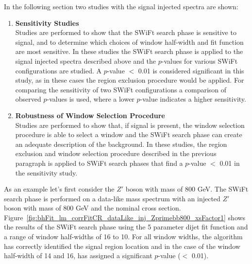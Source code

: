 \newpage
\noindent
In the following section two studies with the signal injected spectra are shown:
\begin{enumerate}
  \item\textbf{Sensitivity Studies}\\
  Studies are performed to show that the SWiFt search phase is sensitive to signal,
  and to determine which choices of window half-width and fit function are most sensitive.
  In these studies the SWiFt search phase is applied to the signal injected spectra described above and
  the \bh{} \mbox{$p$-value}s for various SWiFt configurations are studied.
  A \mbox{$p$-value} $<$ 0.01 is considered significant in this study,
  as in these cases the region exclusion procedure would be applied.
  For comparing the sensitivity of two SWiFt configurations a comparison of
  observed \bh{} \mbox{$p$-value}s is used, where a lower \mbox{$p$-value} indicates a higher sensitivity.\vspace{1em}
  
  \item\textbf{Robustness of Window Selection Procedure}\\
    Studies are performed to show that, if signal is present, the window selection procedure is able to select a window and
    the SWiFt search phase can create an adequate description of the background.
    In these studies, the region exclusion and window selection procedure described in the previous paragraph is applied
    to SWiFt search phases that find a \bh{} \mbox{$p$-value} $<$ 0.01 in the sensitivity study.
\end{enumerate}




As an example let's first consider the $Z'$ boson with mass of 800 GeV.
The  SWiFt search phase is performed on a data-like mass spectrum
with an injected  $Z'$ boson with mass of 800 GeV and the nominal cross section.
Figure~\ref{fig:bhFit_lm_corrFitCR_dataLike_inj_Zprimebb800_xsFactor1}
shows the results of the SWiFt search phase
using the 5 parameter dijet fit function and a range of window half-widths of 16 to 10.
For all window widths, the \bh{} algorithm has correctly identified the signal region location
and in the case of the window half-width of 14 and 16, has assigned a significant \mbox{\mbox{$p$-value}} ($<$ 0.01).

